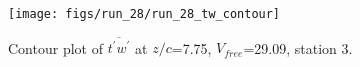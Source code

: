 \begin{figure}[H]
\centering
\texttt{[image: figs/run\_28/run\_28\_tw\_contour]}
\caption{Contour plot of $\overline{t^\prime w^\prime}$ at $z/c$=7.75, $V_{free}$=29.09, station 3.}
\label{fig:run_28_tw_contour}
\end{figure}


